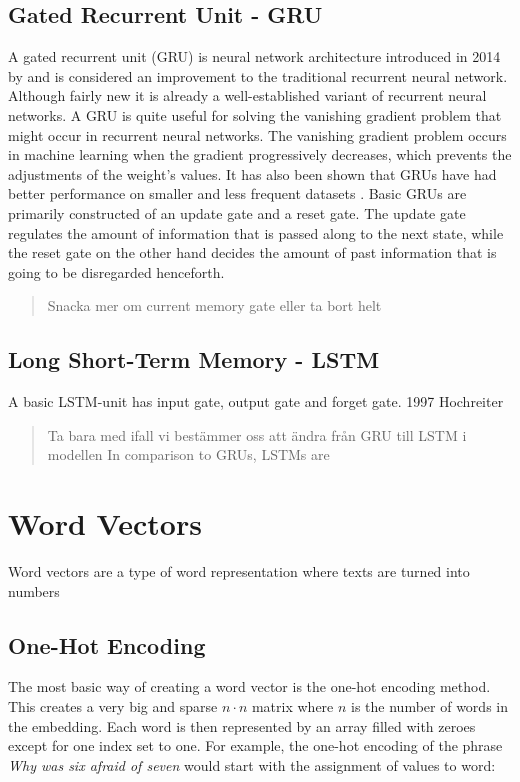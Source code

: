 \documentclass[nofilelist]{cslthse-msc}
\begin{document}
\subsection{Gated Recurrent Unit - GRU}
A gated recurrent unit (GRU) is neural network architecture introduced in 2014 by \citet{cho2014learning} and is considered an improvement to the traditional recurrent neural network. Although fairly new it is already a well-established variant of recurrent neural networks. A GRU is quite useful for solving the vanishing gradient problem \citep{hochreiter1998} that might occur in recurrent neural networks. The vanishing gradient problem occurs in machine learning when the gradient progressively decreases, which prevents the adjustments of the weight's values. It has also been shown that GRUs have had better performance on smaller and less frequent datasets \citep{Gruber2020AreGC}.
Basic GRUs are primarily constructed of an update gate and a reset gate. The update gate regulates the amount of information that is passed along to the next state, while the reset gate on the other hand decides the amount of past information that is going to be disregarded henceforth. 

\begin{quote}
Snacka mer om current memory gate eller ta bort helt
\end{quote}



\subsection{Long Short-Term Memory - LSTM}
A basic LSTM-unit has input gate, output gate and forget gate. 
1997 Hochreiter

\begin{quote}
    Ta bara med ifall vi bestämmer oss att ändra från GRU till LSTM i modellen
    In comparison to GRUs, LSTMs are   

\end{quote}









\section{Word Vectors}
Word vectors are a type of word representation where texts are turned into numbers
\subsection{One-Hot Encoding}
The most basic way of creating a word vector is the one-hot encoding method. This creates a very big and sparse $n \cdot n$ matrix where $n$ is the number of words in the embedding. Each word is then represented by an array filled with zeroes except for one index set to one. For example, the one-hot encoding of the phrase \textit{Why was six afraid of seven} would start with the assignment of values to word:
\end{document}
